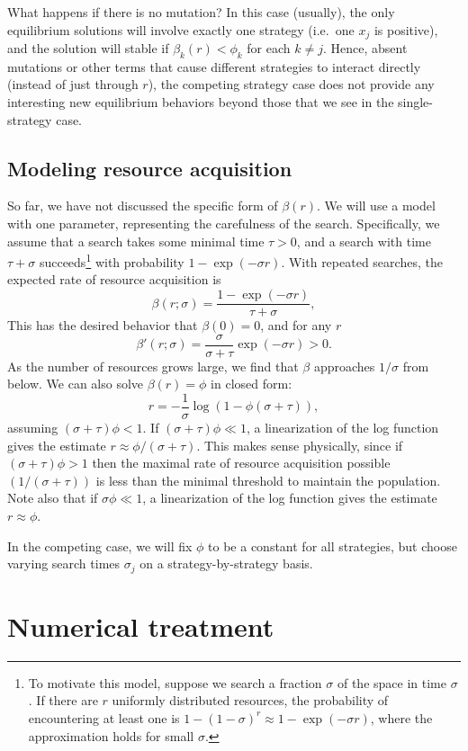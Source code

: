 \documentclass[12pt, leqno]{article} %
\begin{document}
What happens if there is no mutation?  In this case (usually), the
only equilibrium solutions will involve exactly one strategy (i.e.~one
$x_j$ is positive), and the solution will stable if $\beta_k(r) <
\phi_k$ for each $k \neq j$.  Hence, absent mutations or other terms
that cause different strategies to interact directly (instead of just
through $r$), the competing strategy case does not provide any
interesting new equilibrium behaviors beyond those that we see in the
single-strategy case.

\subsection{Modeling resource acquisition}

So far, we have not discussed the specific form of $\beta(r)$.
We will use a model with one parameter, representing the carefulness
of the search.  Specifically, we assume that a search takes
some minimal time $\tau > 0$, and a search with time $\tau + \sigma$
succeeds\footnote{%
  To motivate this model, suppose we search a fraction $\sigma$
  of the space in time $\sigma$.  If there are $r$ uniformly
  distributed resources, the probability of encountering at least
  one is $1-(1-\sigma)^r \approx 1-\exp(-\sigma r)$, where the
  approximation holds for small $\sigma$.
}
with probability $1-\exp(-\sigma r)$.
With repeated searches, the expected rate of resource acquisition is
\[
  \beta(r; \sigma) = \frac{1-\exp(-\sigma r)}{\tau+\sigma},
\]
This has the desired behavior that $\beta(0) = 0$, and for any $r$
\[
  \beta'(r; \sigma) = \frac{\sigma}{\sigma + \tau} \exp(-\sigma r) > 0.
\]
As the number of resources grows large, we find that
$\beta$ approaches $1/\sigma$ from below.
We can also solve $\beta(r) = \phi$ in closed form:
\[
  r = -\frac{1}{\sigma} \log(1-\phi (\sigma + \tau)),
\]
assuming $(\sigma + \tau) \phi < 1$.  If $(\sigma + \tau) \phi \ll 1$,
a linearization of the log function gives the estimate
$r \approx \phi/(\sigma+\tau)$.
This makes sense physically, since if
$(\sigma + \tau) \phi > 1$ then the maximal rate of resource acquisition
possible $(1/(\sigma+\tau))$ is less than the minimal threshold to maintain
the population.  Note also that if $\sigma \phi \ll 1$, a linearization
of the log function gives the estimate $r \approx \phi$.

In the competing case, we will fix $\phi$ to be a constant for all
strategies, but choose varying search times $\sigma_j$ on
a strategy-by-strategy basis.

\section{Numerical treatment}
\end{document}
